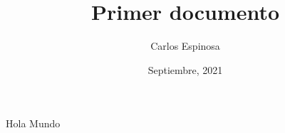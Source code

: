 \documentclass[12pt, letterpaper]{article}
\title{Primer documento}
\author{Carlos Espinosa}
\date{Septiembre, 2021}
\begin{document}
    \maketitle
    Hola Mundo
\end{document}
